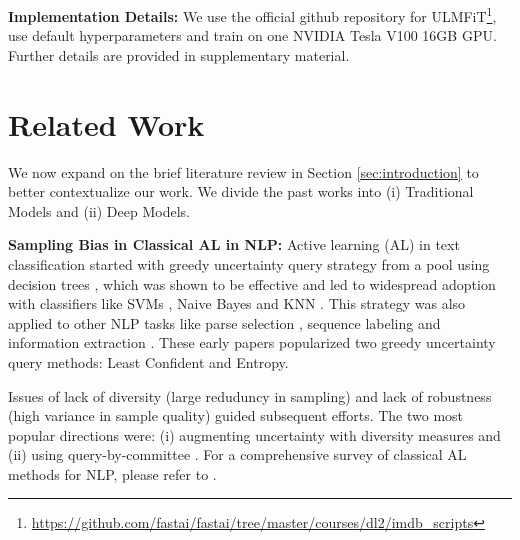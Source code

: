 \documentclass[11pt,a4paper]{article}
\begin{document}
\textbf{Implementation Details:} We use the official github repository for ULMFiT\footnote{\url{https://github.com/fastai/fastai/tree/master/courses/dl2/imdb\_scripts}}, use default hyperparameters and train on one NVIDIA Tesla V100 16GB GPU. Further details are provided in supplementary material.  \section{Related Work}\label{sec:related}
We now expand on the brief literature review in Section \ref{sec:introduction} to better contextualize our work. We divide the past works into (i) Traditional Models and (ii) Deep Models.

\textbf{Sampling Bias in Classical AL in NLP:} Active learning (AL) in text classification started with greedy uncertainty query strategy from a pool using decision trees \cite{lewis1994sequential}, which was shown to be effective and led to widespread adoption with classifiers like SVMs \cite{tong2001support}, Naive Bayes \cite{roy2001toward} and KNN \cite{fujii1998selective}. This strategy was also applied to other NLP tasks like parse selection \cite{baldridge2004active}, sequence labeling \cite{settles2008analysis} and information extraction \cite{thompson1999active}. These early papers popularized two greedy uncertainty query methods: Least Confident and Entropy. 


Issues of lack of diversity (large reduduncy in sampling) \cite{zhang2000value} and lack of robustness (high variance in sample quality)\cite{krogh1994nnensembles} guided subsequent efforts. The two most popular directions were: (i) augmenting uncertainty with diversity measures \cite{hoi2006large, brinker2003incorporating, tang2002active} and (ii) using query-by-committee \cite{mccallum1998employing, liere1997active}. For a comprehensive survey of classical AL methods for NLP, please refer to \cite{settles2009active}.
\end{document}
